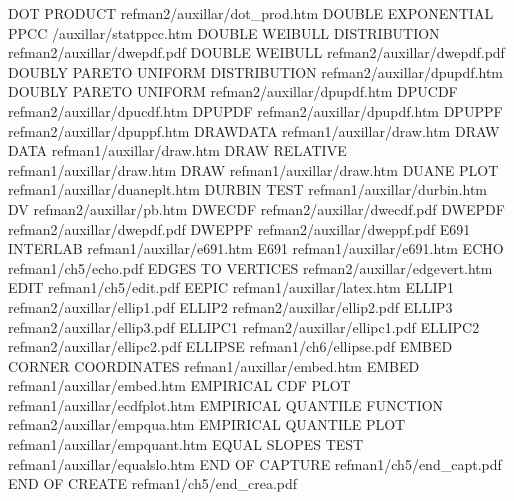 DOT PRODUCT                             refman2/auxillar/dot_prod.htm
DOUBLE EXPONENTIAL PPCC                 /auxillar/statppcc.htm
DOUBLE WEIBULL DISTRIBUTION             refman2/auxillar/dwepdf.pdf
DOUBLE WEIBULL                          refman2/auxillar/dwepdf.pdf
DOUBLY PARETO UNIFORM DISTRIBUTION      refman2/auxillar/dpupdf.htm
DOUBLY PARETO UNIFORM                   refman2/auxillar/dpupdf.htm
DPUCDF                                  refman2/auxillar/dpucdf.htm
DPUPDF                                  refman2/auxillar/dpupdf.htm
DPUPPF                                  refman2/auxillar/dpuppf.htm
DRAWDATA                                refman1/auxillar/draw.htm
DRAW DATA                               refman1/auxillar/draw.htm
DRAW RELATIVE                           refman1/auxillar/draw.htm
DRAW                                    refman1/auxillar/draw.htm
DUANE PLOT                              refman1/auxillar/duaneplt.htm
DURBIN TEST                             refman1/auxillar/durbin.htm
DV                                      refman2/auxillar/pb.htm
DWECDF                                  refman2/auxillar/dwecdf.pdf
DWEPDF                                  refman2/auxillar/dwepdf.pdf
DWEPPF                                  refman2/auxillar/dweppf.pdf
E691 INTERLAB                           refman1/auxillar/e691.htm
E691                                    refman1/auxillar/e691.htm
ECHO                                    refman1/ch5/echo.pdf
EDGES TO VERTICES                       refman2/auxillar/edgevert.htm
EDIT                                    refman1/ch5/edit.pdf
EEPIC                                   refman1/auxillar/latex.htm
ELLIP1                                  refman2/auxillar/ellip1.pdf
ELLIP2                                  refman2/auxillar/ellip2.pdf
ELLIP3                                  refman2/auxillar/ellip3.pdf
ELLIPC1                                 refman2/auxillar/ellipc1.pdf
ELLIPC2                                 refman2/auxillar/ellipc2.pdf
ELLIPSE                                 refman1/ch6/ellipse.pdf
EMBED CORNER COORDINATES                refman1/auxillar/embed.htm
EMBED                                   refman1/auxillar/embed.htm
EMPIRICAL CDF PLOT                      refman1/auxillar/ecdfplot.htm
EMPIRICAL QUANTILE FUNCTION             refman2/auxillar/empqua.htm
EMPIRICAL QUANTILE PLOT                 refman1/auxillar/empquant.htm
EQUAL SLOPES TEST                       refman1/auxillar/equalslo.htm
END OF CAPTURE                          refman1/ch5/end_capt.pdf
END OF CREATE                           refman1/ch5/end_crea.pdf

